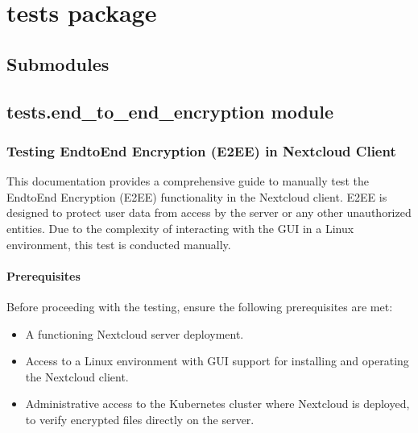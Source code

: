 \documentclass[letterpaper,10pt,english]{sphinxmanual}
\begin{document}
\sphinxstepscope


\section{tests package}
\label{\detokenize{tests:tests-package}}\label{\detokenize{tests::doc}}

\subsection{Submodules}
\label{\detokenize{tests:submodules}}

\subsection{tests.end\_to\_end\_encryption module}
\label{\detokenize{tests:module-tests.end_to_end_encryption}}\label{\detokenize{tests:tests-end-to-end-encryption-module}}

\subsubsection{Testing End\sphinxhyphen{}to\sphinxhyphen{}End Encryption (E2EE) in Nextcloud Client}
\label{\detokenize{tests:testing-end-to-end-encryption-e2ee-in-nextcloud-client}}
\sphinxAtStartPar
This documentation provides a comprehensive guide to manually test the End\sphinxhyphen{}to\sphinxhyphen{}End Encryption (E2EE) functionality in the Nextcloud client. E2EE is designed to protect user data from access by the server or any other unauthorized entities. Due to the complexity of interacting with the GUI in a Linux environment, this test is conducted manually.


\paragraph{Prerequisites}
\label{\detokenize{tests:prerequisites}}
\sphinxAtStartPar
Before proceeding with the testing, ensure the following prerequisites are met:
\begin{itemize}
\item {} 
\sphinxAtStartPar
A functioning Nextcloud server deployment.

\item {} 
\sphinxAtStartPar
Access to a Linux environment with GUI support for installing and operating the Nextcloud client.

\item {} 
\sphinxAtStartPar
Administrative access to the Kubernetes cluster where Nextcloud is deployed, to verify encrypted files directly on the server.

\end{itemize}
\end{document}
